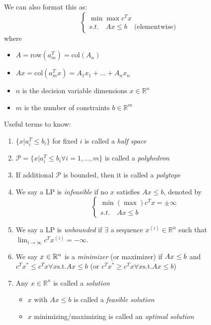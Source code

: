 \documentclass[12pt,oneside]{book}
\numberwithin{equation}{section}
\theoremstyle{definition}
\theoremstyle{plain}
\theoremstyle{remark}
\newcommand{\R}{\mathbb{R}}
\begin{document}
\noindent We can also format this as:
$$
\begin{cases}
    \min \max c^T x \\
    s.t. \quad Ax \le b \quad \text{(elementwise)}
\end{cases}
$$
where
\begin{itemize}
    \item $A = \text{row}(a_m^T) = \text{col}(A_n)$
    \item $Ax= \text{col}(a_m^T x) = A_1x_1 +\text{...}+A_nx_n$
    \item $n$ is the decision variable dimensions $x \in \R^n$
    \item $m$ is the number of constraints $b \in \R^m$
\end{itemize}
Useful terms to know:
\begin{enumerate}
    \item $\{ x | a_i^T \le b_i\}$ for fixed $i$ is called a \emph{half space}
    \item $\mathcal{P}=\{ x | a_i^T \le b_i \forall i = 1,\text{...},m\}$ is called a \emph{polyhedron}
    \item If additional $\mathcal{P}$ is bounded, then it is called a \emph{polytope}
    \item We say a LP is \emph{infeasible} if no $x$ satisfies $Ax\le b$, denoted by
            $$
            \begin{cases}
                \min (\max) c^T x = \pm \infty\\
                s.t. \quad Ax \le b
            \end{cases}
            $$
    \item We say a LP is \emph{unbounded} if $\exists$ a sequence $x^{(i)} \in \R^n$ such that $\lim_{i \rightarrow \infty} c^T x^{(i)} = -\infty$.
    \item We say $x^{\*} \in \R^n$ is a \emph{minimizer} (or maximizer) if $Ax^{\*} \le b$ and $c^Tx^* \le c^Tx \forall x \text{s.t.} Ax \le b$ (or $c^Tx^* \ge c^Tx \forall x \text{s.t.} Ax \le b$) \\
    \item Any $x\in \R^n$ is called a \emph{solution}
    \begin{itemize}
        \item $x$ with $Ax\le b$ is called a \emph{feasible solution}
        \item $x$ minimizing/maximizing is called an \emph{optimal solution}
    \end{itemize}
\end{enumerate}
\end{document}
